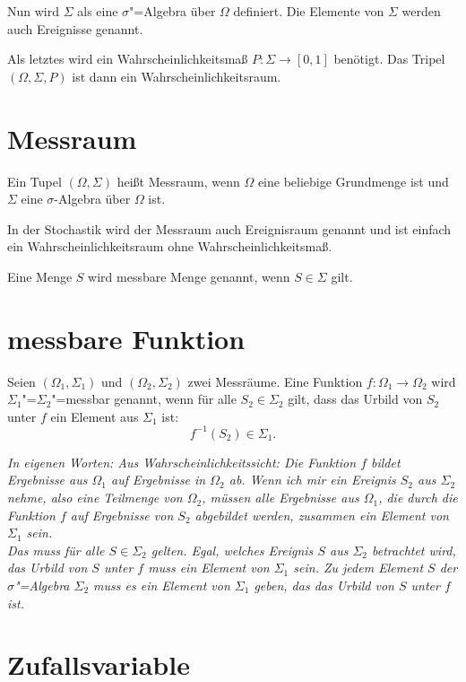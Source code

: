 \documentclass[paper=a4,10pt]{scrartcl}
\begin{document}
\noindent
Nun wird $\Sigma$ als eine $\sigma$"=Algebra über $\Omega$ definiert. Die Elemente von $\Sigma$ werden auch Ereignisse genannt. 

\noindent
Als letztes wird ein Wahrscheinlichkeitsmaß $P: \Sigma \rightarrow [0,1]$ benötigt. Das Tripel $(\Omega, \Sigma, P)$ ist dann ein Wahrscheinlichkeitsraum.
 

\section{Messraum}
Ein Tupel $(\Omega, \Sigma)$ heißt Messraum, wenn $\Omega$ eine beliebige Grundmenge ist und $\Sigma$ eine $\sigma$-Algebra über $\Omega$ ist.

\noindent
In der Stochastik wird der Messraum auch Ereignisraum genannt und ist einfach ein Wahrscheinlichkeitsraum ohne Wahrscheinlichkeitsmaß.

\noindent
Eine Menge $S$ wird messbare Menge genannt, wenn $S \in \Sigma$ gilt.

\section{messbare Funktion}
Seien $(\Omega_1, \Sigma_1)$ und $(\Omega_2, \Sigma_2)$ zwei Messräume. Eine Funktion $f: \Omega_1 \rightarrow \Omega_2$ wird $\Sigma_1$"=$\Sigma_2$"=messbar genannt, wenn für alle $S_2 \in \Sigma_2$ gilt, dass das Urbild von $S_2$ unter $f$ ein Element aus $\Sigma_1$ ist:
\begin{equation}
f^{-1}(S_2) \in \Sigma_1.
\end{equation}

\noindent
\textit{In eigenen Worten: Aus Wahrscheinlichkeitssicht: Die Funktion $f$ bildet Ergebnisse aus $\Omega_1$ auf Ergebnisse in $\Omega_2$ ab. Wenn ich mir ein Ereignis $S_2$ aus $\Sigma_2$ nehme, also eine Teilmenge von $\Omega_2$, müssen alle Ergebnisse aus $\Omega_1$, die durch die Funktion $f$ auf Ergebnisse von $S_2$ abgebildet werden, zusammen ein Element von $\Sigma_1$ sein. \\
Das muss für alle $S \in  \Sigma_2$ gelten. Egal, welches Ereignis $S$ aus $\Sigma_2$ betrachtet wird, das Urbild von $S$ unter $f$ muss ein Element von $\Sigma_1$ sein. Zu jedem Element $S$ der $\sigma$"=Algebra $\Sigma_2$ muss es ein Element von $\Sigma_1$ geben, das das Urbild von $S$ unter $f$ ist.}

\section{Zufallsvariable}
\end{document}
